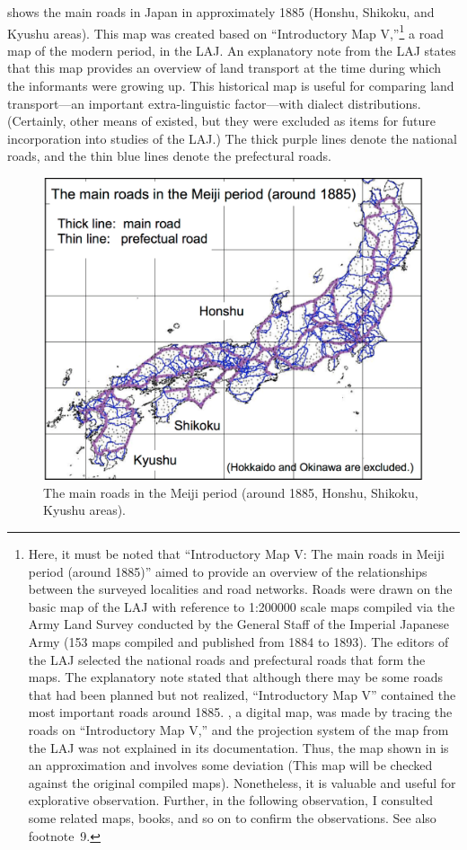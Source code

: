 \documentclass[output=paper]{LSP/langsci}
\begin{document}
 shows the main roads in Japan in approximately 1885 (Honshu, Shikoku, and Kyushu areas). This map was created based on “Introductory Map V,”\footnote{ Here, it must be noted that “Introductory Map V: The main roads in Meiji period (around 1885)” aimed to provide an overview of the relationships between the surveyed localities and road networks. Roads were drawn on the basic map of the LAJ with reference to 1:200000 scale maps compiled via the Army Land Survey conducted by the General Staff of the Imperial Japanese Army (153 maps compiled and published from 1884 to 1893). The editors of the LAJ selected the national roads and prefectural roads that form the maps. The explanatory note stated that although there may be some roads that had been planned but not realized, “Introductory Map V” contained the most important roads around 1885. , a digital map, was made by tracing the roads on “Introductory Map V,” and the projection system of the map from the LAJ was not explained in its documentation. Thus, the map shown in  is an approximation and involves some deviation (This map will be checked against the original compiled maps). Nonetheless, it is valuable and useful for explorative observation. Further, in the following observation, I consulted some related maps, books, and so on to confirm the observations. See also footnote~9.} a road map of the modern period, in the LAJ. An explanatory note from the LAJ states that this map provides an overview of land transport at the time during which the informants were growing up. This historical map is useful for comparing land transport—an important extra-linguistic factor—with dialect distributions. (Certainly, other means of  existed, but they were excluded as items for future incorporation into studies of the LAJ.) The thick purple lines denote the national roads, and the thin blue lines denote the prefectural roads.

\begin{figure}
\includegraphics[height=0.4\textheight]{illustrations/kuma_fig07}
\caption{The main roads in the Meiji period (around 1885, Honshu, Shikoku, Kyushu areas).}          
\label{fig:7}
\end{figure} 
\end{document}
